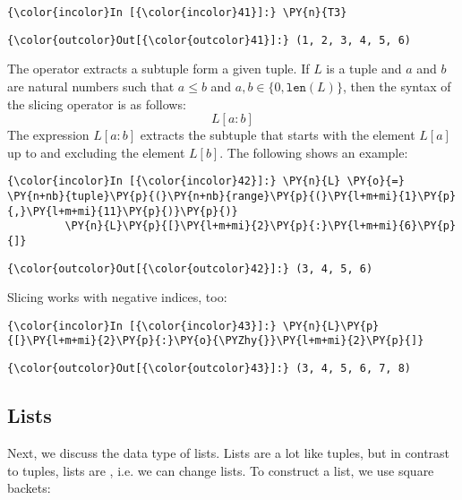 \begin{Verbatim}[commandchars=\\\{\}]
{\color{incolor}In [{\color{incolor}41}]:} \PY{n}{T3}
\end{Verbatim}

\begin{Verbatim}[commandchars=\\\{\}]
{\color{outcolor}Out[{\color{outcolor}41}]:} (1, 2, 3, 4, 5, 6)
\end{Verbatim}
            
The  operator extracts a subtuple form a given tuple. If
\(L\) is a tuple and \(a\) and \(b\) are natural numbers such that
\(a \leq b\) and \(a,b \in \{0, \texttt{len}(L) \}\), then the syntax of
the slicing operator is as follows: \[ L[a:b] \] The expression
\(L[a:b]\) extracts the subtuple that starts with the element \(L[a]\)
up to and excluding the element \(L[b]\). The following shows an
example:

\begin{Verbatim}[commandchars=\\\{\}]
{\color{incolor}In [{\color{incolor}42}]:} \PY{n}{L} \PY{o}{=} \PY{n+nb}{tuple}\PY{p}{(}\PY{n+nb}{range}\PY{p}{(}\PY{l+m+mi}{1}\PY{p}{,}\PY{l+m+mi}{11}\PY{p}{)}\PY{p}{)}
         \PY{n}{L}\PY{p}{[}\PY{l+m+mi}{2}\PY{p}{:}\PY{l+m+mi}{6}\PY{p}{]}
\end{Verbatim}


\begin{Verbatim}[commandchars=\\\{\}]
{\color{outcolor}Out[{\color{outcolor}42}]:} (3, 4, 5, 6)
\end{Verbatim}
            
Slicing works with negative indices, too:

\begin{Verbatim}[commandchars=\\\{\}]
{\color{incolor}In [{\color{incolor}43}]:} \PY{n}{L}\PY{p}{[}\PY{l+m+mi}{2}\PY{p}{:}\PY{o}{\PYZhy{}}\PY{l+m+mi}{2}\PY{p}{]}
\end{Verbatim}

\begin{Verbatim}[commandchars=\\\{\}]
{\color{outcolor}Out[{\color{outcolor}43}]:} (3, 4, 5, 6, 7, 8)
\end{Verbatim}
            
\subsection{Lists}\label{lists}
Next, we discuss the data type of lists. Lists are a lot like tuples,
but in contrast to tuples, lists are , i.e. we can
change lists. To construct a list, we use square backets:

